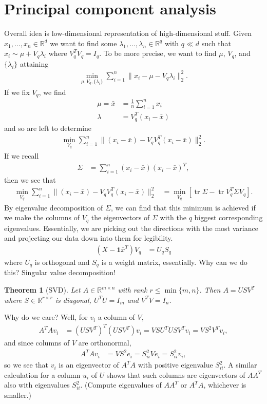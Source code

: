 \documentclass[11pt,letterpaper]{article}
\DeclareMathOperator{\tr}{tr}
\newcommand{\R}{\mathbb{R}}
\theoremstyle{definition}
\theoremstyle{plain}
\newtheorem{thm}{Theorem}[section]
\numberwithin{equation}{section}
\numberwithin{figure}{section}
\begin{document}
\section{Principal component analysis}
Overall idea is low-dimensional representation of high-dimensional stuff. Given $x_1,\ldots,x_n \in \R^d$ we want to find some $\lambda_1,\ldots,\lambda_n \in \R^q$ with $q \ll d$ such that $x_i \sim \mu + V_q \lambda_i$ where $V_q^T V_q = I_q$. To be more precise, we want to find $\mu$, $V_q$, and $\{\lambda_i\}$ attaining
%
\begin{align}
	\min_{\mu,V_q,\{\lambda_i\}} \sum_{i=1}^n \|x_i - \mu - V_q\lambda_i\|_2^2.
\end{align}
%
If we fix $V_q$, we find
%
\begin{align}
	\mu = \bar{x} &= \frac{1}{n} \sum_{i=1}^n x_i\\
	\lambda &= V_q^T (x_i - \bar{x})
\end{align}
%
and so are left to determine
%
\begin{align}
	\min_{V_q} \sum_{i=1}^n \|(x_i-\bar{x}) - V_q V_q^T (x_i - \bar{x})\|_2^2.
\end{align}
%
If we recall
%
\begin{align}
	\Sigma &= \sum_{i=1}^n (x_i-\bar{x})(x_i-\bar{x})^T,
\end{align}
%
then we see that
%
\begin{align}
	\min_{V_q} \sum_{i=1}^n \|(x_i-\bar{x}) - V_q V_q^T (x_i-\bar{x})\|_2^2 &= \min_{V_q} \left[\tr \Sigma - \tr V_q^T \Sigma V_q\right].
\end{align}
%
By eigenvalue decomposition of $\Sigma$, we can find that this minimum is achieved if we make the columns of $V_q$ the eigenvectors of $\Sigma$ with the $q$ biggest corresponding eigenvalues. Essentially, we are picking out the directions with the most variance and projecting our data down into them for legibility.
%
\begin{align}
	(X - \bm{1}\bar{x}^T) V_q &= U_q S_q
\end{align}
%
where $U_q$ is orthogonal and $S_q$ is a weight matrix, essentially. Why can we do this? Singular value decomposition!


\begin{thm}[SVD]
	Let $A \in \R^{m\times n}$ with rank $r \leq \min\{m,n\}$. Then $A = USV^T$ where $S \in \R^{r\times r}$ is diagonal, $U^T U = I_m$ and $V^T V = I_n$.
\end{thm}

Why do we care? Well, for $v_i$ a column of $V$,
%
\begin{align}
	A^T A v_i &= (USV^T)^T(USV^T)v_i = V S U^T U S V^T v_i = V S^2 V^T v_i,
\end{align}
%
and since columns of $V$ are orthonormal,
%
\begin{align}
	A^T A v_i &= V S^2 e_i = S_{ii}^2 V e_i = S_{ii}^2 v_i,
\end{align}
%
so we see that $v_i$ is an eigenvector of $A^T A$ with positive eigenvalue $S_{ii}^2$. A similar calculation for a column $u_i$ of $U$ shows that such columns are eigenvectors of $A A^T$ also with eigenvalues $S_{ii}^2$. (Compute eigenvalues of $A A^T$ or $A^T A$, whichever is smaller.)
\end{document}
